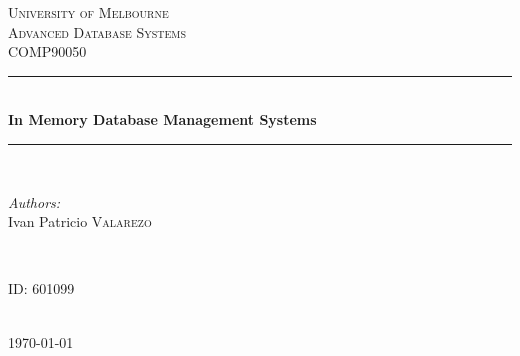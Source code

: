 \documentclass[10pt]{article} %
\begin{document}

\begin{titlepage}

\newcommand{\HRule}{\rule{\linewidth}{0.5mm}} %

\center %

\textsc{\LARGE University of Melbourne}\\[1.5cm] %
\textsc{\Large Advanced Database Systems}\\[0.5cm] %
\textsc{\large COMP90050}\\[0.5cm] %

\HRule \\[0.4cm]
{ \huge \bfseries In Memory Database Management Systems}\\[0.4cm] %
\HRule \\[1.5cm]

\begin{minipage}{0.4\textwidth}
\begin{flushleft} \large
\emph{Authors:}\\
Ivan Patricio \textsc{Valarezo} %
\end{flushleft}
\end{minipage}
~
\begin{minipage}{0.4\textwidth}
\begin{flushright} \large
ID: \textsc{601099} %
\end{flushright}
\end{minipage}\\[4cm]

{\large \today}\\[3cm] %


\vfill %

\end{titlepage}
\end{document}

